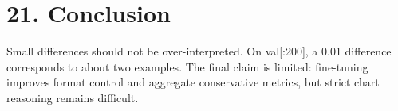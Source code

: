 \documentclass[11pt]{article}
\begin{document}
\section*{21. Conclusion}
Small differences should not be over-interpreted. On val[:200], a 0.01 difference corresponds to about two examples. The final claim is limited: fine-tuning improves format control and aggregate conservative metrics, but strict chart reasoning remains difficult.
\end{document}
